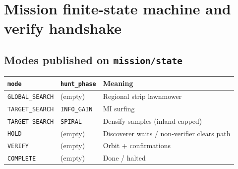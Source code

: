\chapter{Mission finite-state machine and verify handshake}
\label{ch:fsm}

\section{Modes published on \texttt{mission/state}}
\begin{center}
\begin{tabular}{@{}lll@{}}
\toprule
\texttt{mode} & \texttt{hunt\_phase} & Meaning \\
\midrule
\texttt{GLOBAL\_SEARCH} & (empty) & Regional strip lawnmower \\
\texttt{TARGET\_SEARCH} & \texttt{INFO\_GAIN} & MI surfing \\
\texttt{TARGET\_SEARCH} & \texttt{SPIRAL} & Densify samples (inland-capped) \\
\texttt{HOLD} & (empty) & Discoverer waits / non-verifier clears path \\
\texttt{VERIFY} & (empty) & Orbit + confirmations \\
\texttt{COMPLETE} & (empty) & Done / halted \\
\bottomrule
\end{tabular}
\end{center}

